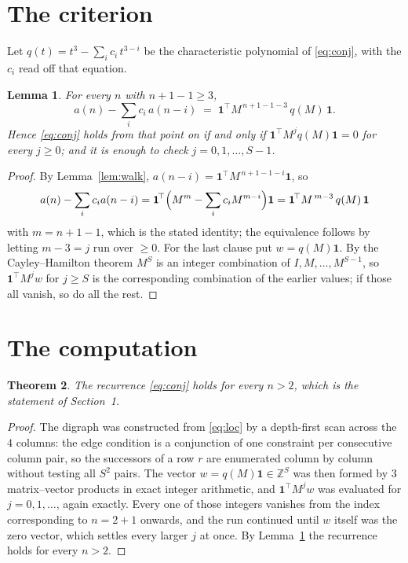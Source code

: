 \documentclass[11pt,a4paper]{article}
\theoremstyle{plain}
\newtheorem{theorem}{Theorem}
\newtheorem{lemma}[theorem]{Lemma}
\theoremstyle{definition}
\begin{document}
\section{The criterion}

Let $q(t)=t^{3}-\sum_i c_i\,t^{3-i}$ be the characteristic polynomial of
\eqref{eq:conj}, with the $c_i$ read off that equation.

\begin{lemma}\label{lem:crit}
For every $n$ with $n+1-1\ge3$,
\[
a(n)-\sum_i c_i\,a(n-i)\;=\;\mathbf{1}^{\!\top}M^{\,n+1-1-3}\,q(M)\,\mathbf{1} .
\]
Hence \eqref{eq:conj} holds from that point on if and only if
$\mathbf{1}^{\!\top}M^{j}q(M)\mathbf{1}=0$ for every $j\ge0$; and it is enough to check
$j=0,1,\dots,S-1$.
\end{lemma}

\begin{proof}
By Lemma~\ref{lem:walk}, $a(n-i)=\mathbf{1}^{\!\top}M^{\,n+1-1-i}\mathbf{1}$, so
\[
a(n)-\sum_i c_i a(n-i)
=\mathbf{1}^{\!\top}\Bigl(M^{m}-\sum_i c_i M^{m-i}\Bigr)\mathbf{1}
=\mathbf{1}^{\!\top}M^{\,m-3}\,q(M)\,\mathbf{1}
\]
with $m=n+1-1$, which is the stated identity; the equivalence follows by letting
$m-3=j$ run over $\ge0$. For the last clause put $w=q(M)\mathbf{1}$. By the
Cayley--Hamilton theorem $M^{S}$ is an integer combination of $I,M,\dots,M^{S-1}$, so
$\mathbf{1}^{\!\top}M^{j}w$ for $j\ge S$ is the corresponding combination of the earlier
values; if those all vanish, so do all the rest.
\end{proof}

\section{The computation}

\begin{theorem}
The recurrence \eqref{eq:conj} holds for every $n>2$, which is the statement of
Section~1.
\end{theorem}

\begin{proof}
The digraph was constructed from \eqref{eq:loc} by a depth-first scan across the $4$
columns: the edge condition is a conjunction of one constraint per consecutive column
pair, so the successors of a row $r$ are enumerated column by column without testing all
$S^2$ pairs. The vector $w=q(M)\mathbf{1}\in\mathbb{Z}^{S}$ was then formed by $3$
matrix--vector products in exact integer arithmetic, and $\mathbf{1}^{\!\top}M^{j}w$ was
evaluated for $j=0,1,\dots$, again exactly. Every one of those integers vanishes from the
index corresponding to $n=2+1$ onwards, and the run continued until $w$ itself was the
zero vector, which settles every larger $j$ at once. By Lemma~\ref{lem:crit} the recurrence
holds for every $n>2$.
\end{proof}
\end{document}
